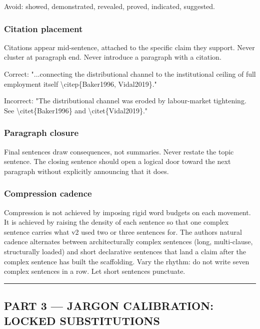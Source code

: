 Avoid: showed, demonstrated, revealed, proved, indicated, suggested.

\subsubsection{Citation placement}\label{citation-placement}

Citations appear mid-sentence, attached to the specific claim they
support. Never cluster at paragraph end. Never introduce a paragraph
with a citation.

Correct: "...connecting the distributional channel to the institutional
ceiling of full employment itself \textbackslash citep\{Baker1996,
Vidal2019\}."

Incorrect: "The distributional channel was eroded by labour-market
tightening. See \textbackslash citet\{Baker1996\} and
\textbackslash citet\{Vidal2019\}."

\subsubsection{Paragraph closure}\label{paragraph-closure}

Final sentences draw consequences, not summaries. Never restate the
topic sentence. The closing sentence should open a logical door toward
the next paragraph without explicitly announcing that it does.

\subsubsection{Compression cadence}\label{compression-cadence}

Compression is not achieved by imposing rigid word budgets on each
movement. It is achieved by raising the density of each sentence so that
one complex sentence carries what v2 used two or three sentences for.
The author\textquotesingle s natural cadence alternates between
architecturally complex sentences (long, multi-clause, structurally
loaded) and short declarative sentences that land a claim after the
complex sentence has built the scaffolding. Vary the rhythm: do not
write seven complex sentences in a row. Let short sentences punctuate.

\begin{center}\rule{0.5\linewidth}{0.5pt}\end{center}

\subsection{PART 3 --- JARGON CALIBRATION: LOCKED
SUBSTITUTIONS}\label{part-3--jargon-calibration-locked-substitutions}

